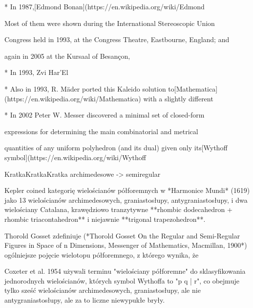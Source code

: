 * In 1987,[Edmond Bonan](https://en.wikipedia.org/wiki/Edmond%

Most of them were shown during the International Stereoscopic Union

Congress held in 1993, at the Congress Theatre, Eastbourne, England; and

again in 2005 at the Kursaal of Besançon, %

* In 1993, Zvi Har'El %

* Also in 1993, R. Mäder ported this Kaleido solution to[Mathematica](https://en.wikipedia.org/wiki/Mathematica) with a slightly different %

* In 2002 Peter W. Messer discovered a minimal set of closed-form

expressions for determining the main combinatorial and metrical

quantities of any uniform polyhedron (and its dual) given only its[Wythoff symbol](https://en.wikipedia.org/wiki/Wythoff%

KratkaKratkaKratka archimedesowe -> semiregular

Kepler coined kategorię wielościanów półforemnych w *Harmonice Mundi* (1619) jako 13 wielościanów archimedesowych, graniastosłupy, antygraniastosłupy, i dwa wielościany Catalana, krawędziowo tranzytywne **rhombic dodecahedron + rhombic triacontahedron** i niejawnie **trigonal trapezohedron**.

Thorold Gosset zdefiniuje (*Thorold Gosset On the Regular and Semi-Regular Figures in Space of n Dimensions, Messenger of Mathematics, Macmillan, 1900*) ogólniejsze pojęcie wielotopu półforemnego, z którego wynika, że

Coxeter et al. 1954 używali terminu "wielościany półforemne" do sklasyfikowania jednorodnych wielościanów, których symbol Wythoffa to "p q | r", co obejmuje tylko sześć wielościanów archimedesowych, graniastosłupy, ale nie antygraniastosłupy, ale za to liczne niewypukłe bryły.

